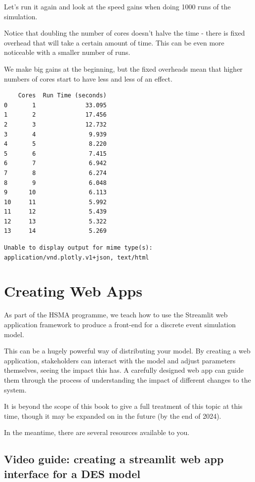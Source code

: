 \documentclass[
  letterpaper,
  DIV=11,
  numbers=noendperiod]{scrreprt}
\begin{document}
Let's run it again and look at the speed gains when doing 1000 runs of
the simulation.

Notice that doubling the number of cores doesn't halve the time - there
is fixed overhead that will take a certain amount of time. This can be
even more noticeable with a smaller number of runs.

We make big gains at the beginning, but the fixed overheads mean that
higher numbers of cores start to have less and less of an effect.

\begin{verbatim}
    Cores  Run Time (seconds)
0       1              33.095
1       2              17.456
2       3              12.732
3       4               9.939
4       5               8.220
5       6               7.415
6       7               6.942
7       8               6.274
8       9               6.048
9      10               6.113
10     11               5.992
11     12               5.439
12     13               5.322
13     14               5.269
\end{verbatim}

\begin{verbatim}
Unable to display output for mime type(s): application/vnd.plotly.v1+json, text/html
\end{verbatim}

\chapter{Creating Web Apps}\label{creating-web-apps}

As part of the HSMA programme, we teach how to use the Streamlit web
application framework to produce a front-end for a discrete event
simulation model.

This can be a hugely powerful way of distributing your model. By
creating a web application, stakeholders can interact with the model and
adjust parameters themselves, seeing the impact this has. A carefully
designed web app can guide them through the process of understanding the
impact of different changes to the system.

It is beyond the scope of this book to give a full treatment of this
topic at this time, though it may be expanded on in the future (by the
end of 2024).

In the meantime, there are several resources available to you.

\section{Video guide: creating a streamlit web app interface for a DES
model}\label{video-guide-creating-a-streamlit-web-app-interface-for-a-des-model}
\end{document}
